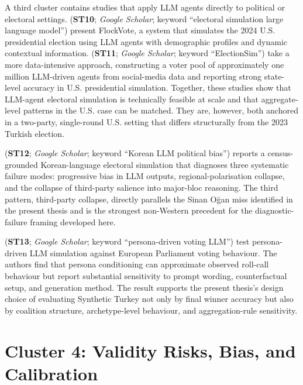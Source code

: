 \documentclass[12pt,a4paper]{report}
\begin{document}
A third cluster contains studies that apply LLM agents directly to political or electoral settings. \citet{zhou2025flockvote} (\textbf{ST10}; \emph{Google Scholar}; keyword \enquote{electoral simulation large language model}) present FlockVote, a system that simulates the 2024 U.S. presidential election using LLM agents with demographic profiles and dynamic contextual information. \citet{zhang2024electionsim} (\textbf{ST11}; \emph{Google Scholar}; keyword \enquote{ElectionSim}) take a more data-intensive approach, constructing a voter pool of approximately one million LLM-driven agents from social-media data and reporting strong state-level accuracy in U.S. presidential simulation. Together, these studies show that LLM-agent electoral simulation is technically feasible at scale and that aggregate-level patterns in the U.S. case can be matched. They are, however, both anchored in a two-party, single-round U.S. setting that differs structurally from the 2023 Turkish election.

\citet{kang2026dynamok} (\textbf{ST12}; \emph{Google Scholar}; keyword \enquote{Korean LLM political bias}) reports a census-grounded Korean-language electoral simulation that diagnoses three systematic failure modes: progressive bias in LLM outputs, regional-polarisation collapse, and the collapse of third-party salience into major-bloc reasoning. The third pattern, third-party collapse, directly parallels the Sinan O\u{g}an miss identified in the present thesis and is the strongest non-Western precedent for the diagnostic-failure framing developed here.

\citet{kreutner2026ep} (\textbf{ST13}; \emph{Google Scholar}; keyword \enquote{persona-driven voting LLM}) test persona-driven LLM simulation against European Parliament voting behaviour. The authors find that persona conditioning can approximate observed roll-call behaviour but report substantial sensitivity to prompt wording, counterfactual setup, and generation method. The result supports the present thesis's design choice of evaluating Synthetic Turkey not only by final winner accuracy but also by coalition structure, archetype-level behaviour, and aggregation-rule sensitivity.

\section{Cluster 4: Validity Risks, Bias, and Calibration}
\label{sec:litcluster4}
\end{document}
